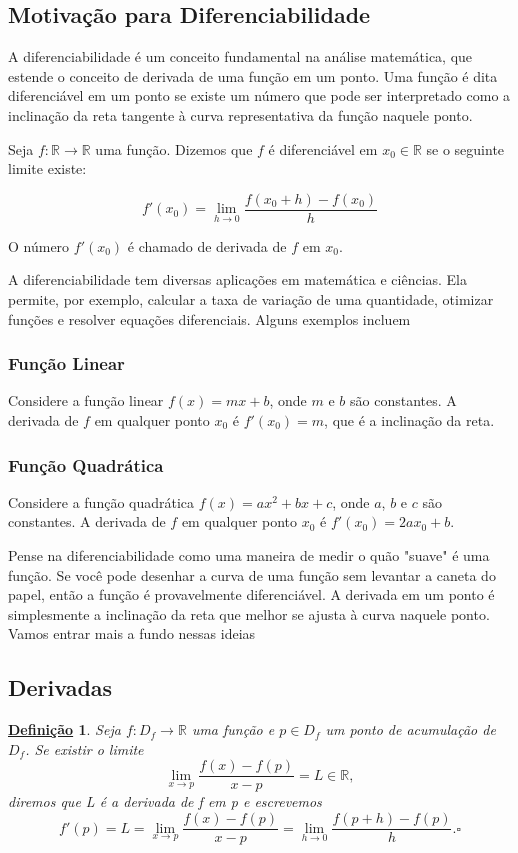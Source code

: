 \documentclass{article}
\newtheorem*{def*}{\underline{Defini\c c\~ao}}
\begin{document}
\subsection{Motiva\c cão para Diferenciabilidade}
 A diferenciabilidade é um conceito fundamental na análise matemática, que
estende o conceito de derivada de uma função em um ponto. Uma função é dita
diferenciável em um ponto se existe um número que pode ser interpretado como
a inclinação da reta tangente à curva representativa da função naquele ponto.

 Seja $f: \mathbb{R} \to \mathbb{R}$ uma função. Dizemos que $f$ é 
diferenciável em $x_0 \in \mathbb{R}$ se o seguinte limite existe:

\begin{equation}
f'(x_0) = \lim_{{h \to 0}} \frac{f(x_0 + h) - f(x_0)}{h}
\end{equation}

O número $f'(x_0)$ é chamado de derivada de $f$ em $x_0$.

A diferenciabilidade tem diversas aplicações em matemática e ciências. 
Ela permite, por exemplo, calcular a taxa de variação de uma quantidade, 
otimizar funções e resolver equações diferenciais. Alguns exemplos incluem

\subsubsection{Função Linear}

Considere a função linear $f(x) = mx + b$, onde $m$ e $b$ são constantes. A derivada de $f$ em qualquer ponto $x_0$ é $f'(x_0) = m$, que é a inclinação da reta.

\subsubsection{Função Quadrática}

Considere a função quadrática $f(x) = ax^2 + bx + c$, onde $a$, $b$ e $c$ são constantes. A derivada de $f$ em qualquer ponto $x_0$ é $f'(x_0) = 2ax_0 + b$.

Pense na diferenciabilidade como uma maneira de medir o quão "suave" é uma função. Se você pode desenhar a curva de uma função sem levantar a caneta do papel, então a função é provavelmente diferenciável. A derivada em um ponto é simplesmente a inclinação da reta que melhor se ajusta à curva naquele ponto.
Vamos entrar mais a fundo nessas ideias

\subsection{Derivadas}
\begin{def*}
  Seja \(f:D_{f}\rightarrow \mathbb{R}\) uma fun\c cão e \(p\in D_{f}\) um ponto de
  acumula\c cão de \(D_{f}\). Se existir o limite 
    \[
      \lim_{x\to p}\frac{f(x)-f(p)}{x-p} = L\in \mathbb{R},
    \]
    diremos que L é a derivada de f em p e escrevemos 
      \[
        f'(p) = L = \lim_{x\to p}\frac{f(x)-f(p)}{x-p}=\lim_{h\to 0}\frac{f(p+h)-f(p)}{h}. \square
      \]
\end{def*}
\end{document}

